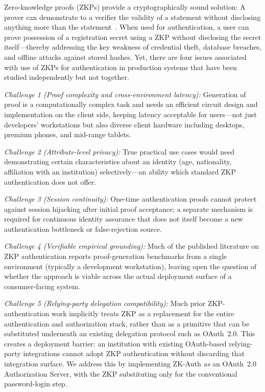 \documentclass[journal,twoside,10pt]{IEEEtran}
\begin{document}
Zero-knowledge proofs (ZKPs) provide a cryptographically sound solution:
A prover can demonstrate to a verifier the validity of a statement without
disclosing anything more than the statement~\cite{gmr89}. When used for
authentication, a user can prove possession of a registration secret using
a ZKP without disclosing the secret itself---thereby addressing the key
weakness of credential theft, database breaches, and offline attacks
against stored hashes. Yet, there are four issues associated with use of
ZKPs for authentication in production systems that have been studied
independently but not together.

\textit{Challenge 1 (Proof complexity and cross-environment latency):} Generation of proof
is a computationally complex task and needs an efficient circuit design
and implementation on the client side, keeping latency acceptable for
users---not just developers’ workstations but also diverse client
hardware including desktops, premium phones, and mid-range tablets.

\textit{Challenge 2 (Attribute-level privacy):} True practical use cases would need demonstrating certain characteristics about an identity (age, nationality, affiliation with an institution) selectively---an ability which standard ZKP authentication does not offer.

\textit{Challenge 3 (Session continuity):} One-time authentication proofs
cannot protect against session hijacking after initial proof acceptance;
a separate mechanism is required for continuous identity assurance that does
not itself become a new authentication bottleneck or false-rejection source.

\textit{Challenge 4 (Verifiable empirical grounding):} Much of the published
literature on ZKP authentication reports proof-generation benchmarks from a
single environment (typically a development workstation), leaving open the
question of whether the approach is viable across the actual deployment
surface of a consumer-facing system.

\textit{Challenge 5 (Relying-party delegation compatibility):} Much prior
ZKP-authentication work implicitly treats ZKP as a replacement for the
entire authentication and authorization stack, rather than as a primitive
that can be substituted underneath an existing delegation protocol such as
OAuth~2.0. This creates a deployment barrier: an institution with existing
OAuth-based relying-party integrations cannot adopt ZKP authentication
without discarding that integration surface. We address this by
implementing ZK-Auth \textit{as} an OAuth~2.0 Authorization Server, with
the ZKP substituting only for the conventional password-login step.
\end{document}
